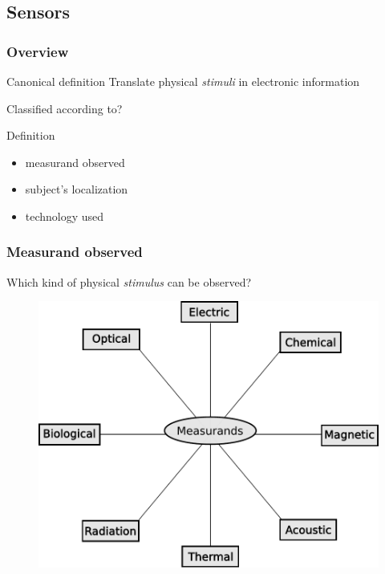 \documentclass{beamer}
\begin{document}
\subsection{Sensors}

	\begin{frame}
		\frametitle{Overview}
	
		\begin{block}{Canonical definition}
			Translate physical \textit{stimuli} in electronic information
		\end{block}
	
		Classified according to?	
		\begin{block}{Definition}
			\begin{itemize}
			\item measurand observed
			\item subject's localization
			\item technology used
			\end{itemize}
		\end{block}			
	
	\end{frame}

	\begin{frame}
		\frametitle{Measurand observed}
		Which kind of physical \textit{stimulus} can be observed?
		\begin{figure}[h]
			\center
			\includegraphics[scale=0.4]{../img/fig:sensors}
		 \end{figure}				
	\end{frame}
	
\end{document}
